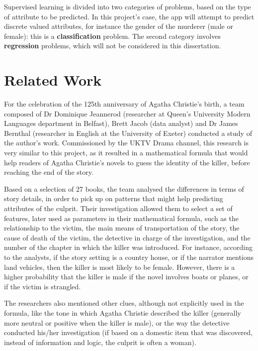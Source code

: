 \documentclass{mproj}
\begin{document}
Supervised learning is divided into two categories of problems, based on the type of attribute to be predicted. In this project's case, the app will attempt to predict discrete valued attributes, for instance the gender of the murderer (male or female): this is a \textbf{classification} problem. The second category involves \textbf{regression} problems, which will not be considered in this dissertation.


\section{Related Work}

For the celebration of the 125th anniversary of Agatha Christie's birth, a team composed of Dr Dominique Jeannerod (researcher at Queen's University Modern Languages department in Belfast), Brett Jacob (data analyst) and Dr James Bernthal (researcher in English at the University of Exeter) conducted a study of the author's work. \cite{whodunnitbelfast} \cite{whodunnitguardian}
Commissioned by the UKTV Drama channel, this research is very similar to this project, as it resulted in a mathematical formula that would help readers of Agatha Christie's novels to guess the identity of the killer, before reaching the end of the story. \par

Based on a selection of 27 books, the team analysed the differences in terms of story details, in order to pick up on patterns that might help predicting attributes of the culprit. Their investigation allowed them to select a set of features, later used as parameters in their mathematical formula, such as the relationship to the victim, the main means of transportation of the story, the cause of death of the victim, the detective in charge of the investigation, and the number of the chapter in which the killer was introduced. For instance, according to the analysts, if the story setting is a country house, or if the narrator mentions land vehicles, then the killer is most likely to be female. However, there is a higher probability that the killer is male if the novel involves boats or planes, or if the victim is strangled. \par

The researchers also mentioned other clues, although not explicitly used in the formula, like the tone in which Agatha Christie described the killer (generally more neutral or positive when the killer is male), or the way the detective conducted his/her investigation (if based on a domestic item that was discovered, instead of information and logic, the culprit is often a woman).  \par
\end{document}
